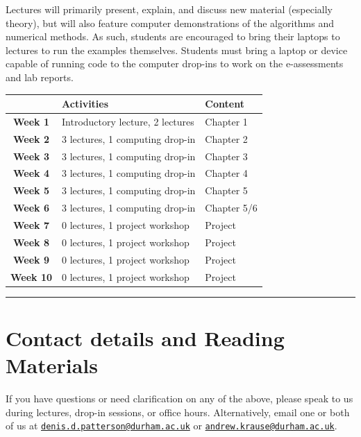 \documentclass[
  letterpaper,
  DIV=11,
  numbers=noendperiod]{scrreprt}
\begin{document}

Lectures will primarily present, explain, and discuss new material
(especially theory), but will also feature computer demonstrations of
the algorithms and numerical methods. As such, students are encouraged
to bring their laptops to lectures to run the examples themselves.
Students must bring a laptop or device capable of running code to the
computer drop-ins to work on the e-assessments and lab reports.

\begin{longtable}[]{@{}cll@{}}
\toprule\noalign{}
& Activities & Content \\
\midrule\noalign{}
\endhead
\bottomrule\noalign{}
\endlastfoot
\textbf{Week 1} & Introductory lecture, 2 lectures & Chapter 1 \\
\textbf{Week 2} & 3 lectures, 1 computing drop-in & Chapter 2 \\
\textbf{Week 3} & 3 lectures, 1 computing drop-in & Chapter 3 \\
\textbf{Week 4} & 3 lectures, 1 computing drop-in & Chapter 4 \\
\textbf{Week 5} & 3 lectures, 1 computing drop-in & Chapter 5 \\
\textbf{Week 6} & 3 lectures, 1 computing drop-in & Chapter 5/6 \\
\textbf{Week 7} & 0 lectures, 1 project workshop & Project \\
\textbf{Week 8} & 0 lectures, 1 project workshop & Project \\
\textbf{Week 9} & 0 lectures, 1 project workshop & Project \\
\textbf{Week 10} & 0 lectures, 1 project workshop & Project \\
\end{longtable}

\begin{center}\rule{0.5\linewidth}{0.5pt}\end{center}

\section*{Contact details and Reading
Materials}\label{contact-details-and-reading-materials}


If you have questions or need clarification on any of the above, please
speak to us during lectures, drop-in sessions, or office hours.
Alternatively, email one or both of us at
\href{mailto:denis.d.patterson@durham.ac.uk}{\nolinkurl{denis.d.patterson@durham.ac.uk}}
or
\href{mailto:andrew.krause@durham.ac.uk}{\nolinkurl{andrew.krause@durham.ac.uk}}.
\end{document}
